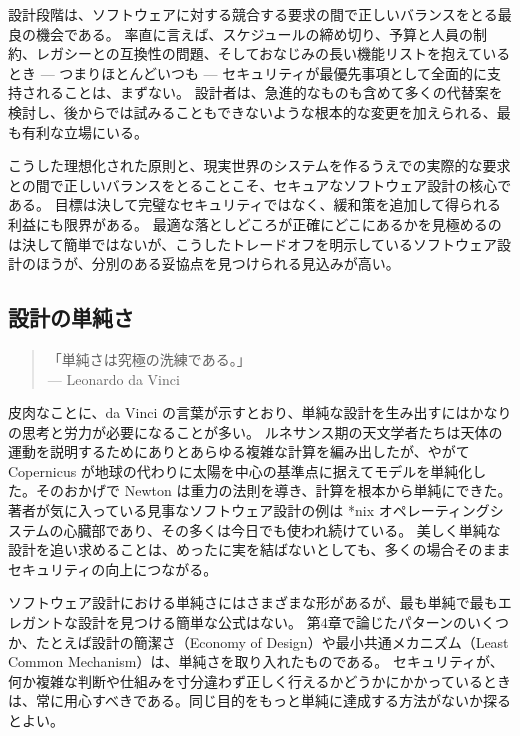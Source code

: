 \documentclass[uplatex]{jsarticle}
\def\label#1{}%
\begin{document}
設計段階は、ソフトウェアに対する競合する要求の間で正しいバランスをとる最良の機会である。
率直に言えば、スケジュールの締め切り、予算と人員の制約、レガシーとの互換性の問題、そしておなじみの長い機能リストを抱えているとき --- つまりほとんどいつも --- セキュリティが最優先事項として全面的に支持されることは、まずない。
設計者は、急進的なものも含めて多くの代替案を検討し、後からでは試みることもできないような根本的な変更を加えられる、最も有利な立場にいる。

こうした理想化された原則と、現実世界のシステムを作るうえでの実際的な要求との間で正しいバランスをとることこそ、セキュアなソフトウェア設計の核心である。
目標は決して完璧なセキュリティではなく、緩和策を追加して得られる利益にも限界がある。
最適な落としどころが正確にどこにあるかを見極めるのは決して簡単ではないが、こうしたトレードオフを明示しているソフトウェア設計のほうが、分別のある妥協点を見つけられる見込みが高い。

\subsection{設計の単純さ}\label{subsec:ch6-design-simplicity}

\begin{quote}
「単純さは究極の洗練である。」\\
\hfill --- Leonardo da Vinci
\end{quote}

皮肉なことに、da Vinci の言葉が示すとおり、単純な設計を生み出すにはかなりの思考と労力が必要になることが多い。
ルネサンス期の天文学者たちは天体の運動を説明するためにありとあらゆる複雑な計算を編み出したが、やがて Copernicus が地球の代わりに太陽を中心の基準点に据えてモデルを単純化した。そのおかげで Newton は重力の法則を導き、計算を根本から単純にできた。
著者が気に入っている見事なソフトウェア設計の例は *nix オペレーティングシステムの心臓部であり、その多くは今日でも使われ続けている。
美しく単純な設計を追い求めることは、めったに実を結ばないとしても、多くの場合そのままセキュリティの向上につながる。

ソフトウェア設計における単純さにはさまざまな形があるが、最も単純で最もエレガントな設計を見つける簡単な公式はない。
第4章で論じたパターンのいくつか、たとえば設計の簡潔さ（Economy of Design）や最小共通メカニズム（Least Common Mechanism）は、単純さを取り入れたものである。
セキュリティが、何か複雑な判断や仕組みを寸分違わず正しく行えるかどうかにかかっているときは、常に用心すべきである。同じ目的をもっと単純に達成する方法がないか探るとよい。
\end{document}

